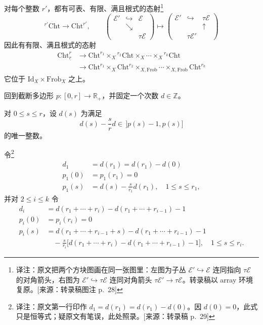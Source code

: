 对每个整数 $r'$，都有可表、有限、满且根式的态射\footnote{译注：原文把两个方块图画在同一张图里：左图为子丛 $\mathcal{E}'\hookrightarrow\mathcal{E}$ 连同指向 $\tau\mathcal{E}$ 的对角箭头，右图为 $\mathcal{E}'\hookrightarrow\tau\mathcal{E}$ 连同对角箭头 $\tau\mathcal{E}'\to\tau\mathcal{E}$。转录稿以 array 环境复原。[来源：转录稿图注 p.~28]}
\[
{}^{r'}\mathrm{Cht}\to\mathrm{Cht}^{r'},\qquad
\left(\begin{array}{ccc}
\mathcal{E}' & \hookrightarrow & \mathcal{E}\\
 & \searrow & \\
 & & \tau\mathcal{E}
\end{array}\right)
\longmapsto
\left(\begin{array}{ccc}
\mathcal{E}' & \hookrightarrow & \tau\mathcal{E}\\
 & & \uparrow\\
 & \tau\mathcal{E}' &
\end{array}\right)
\]
因此有有限、满且根式的态射
\[
\begin{aligned}
\mathrm{Cht}^{r}_{\underline{r}} &\to \mathrm{Cht}^{r_{1}}\times_{X}{}^{r_{2}}\mathrm{Cht}\times_{X}\cdots\times_{X}{}^{r_{k}}\mathrm{Cht}\\
&\to \mathrm{Cht}^{r_{1}}\times_{X}\mathrm{Cht}^{r_{2}}\times_{X,\mathrm{Frob}}\cdots\times_{X,\mathrm{Frob}}\mathrm{Cht}^{r_{k}}
\end{aligned}
\]
它位于 $\mathrm{Id}_{X}\times\mathrm{Frob}_{X}$ 之上。

回到截断多边形 $p:[0,r]\to\mathbb{R}_{+}$，并固定一个次数 $d\in\mathbb{Z}$。

对 $0\le s\le r$，设 $d(s)$ 为满足
\[
d(s)-\frac{s}{r}d\in\,]p(s)-1,p(s)]
\]
的唯一整数。

令\footnote{译注：原文第一行印作 $d_{1}=d(r_{1})=d(r_{1})-d(0)$。因 $d(0)=0$，此式只是恒等式；疑原文有笔误，此处照录。[来源：转录稿 p.~29]}
\[
\begin{aligned}
d_{1} &= d(r_{1}) = d(r_{1})-d(0)\\
p_{1}(0) &= p_{1}(r_{1}) = 0\\
p_{1}(s) &= d(s)-\frac{s}{r_{1}}d(r_{1}),\quad 1\le s\le r_{1},
\end{aligned}
\]
并对 $2\le i\le k$ 令
\[
\begin{aligned}
d_{i} &= d(r_{1}+\cdots+r_{i})-d(r_{1}+\cdots+r_{i-1})-1\\
p_{i}(0) &= p_{i}(r_{i}) = 0\\
p_{i}(s) &= d(r_{1}+\cdots+r_{i-1}+s)-d(r_{1}+\cdots+r_{i-1})-1\\
&\quad -\frac{s}{r_{i}}\big[d(r_{1}+\cdots+r_{i})-d(r_{1}+\cdots+r_{i-1})-1\big],\quad 1\le s\le r_{i}.
\end{aligned}
\]

